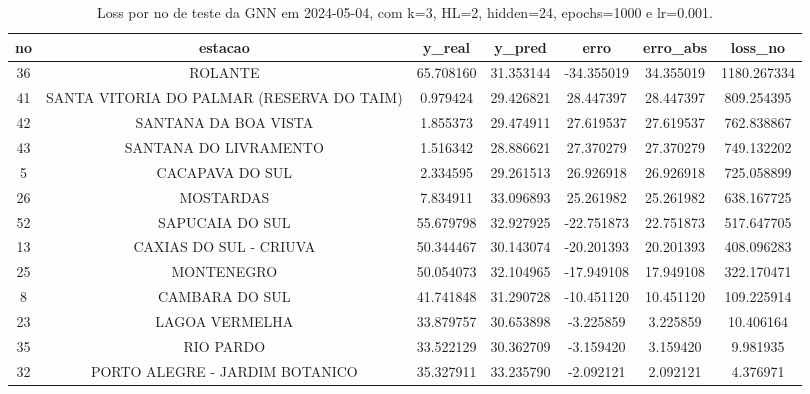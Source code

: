 \begin{table}[h]
\centering
\caption{Loss por no de teste da GNN em 2024-05-04, com k=3, HL=2, hidden=24, epochs=1000 e lr=0.001.}
\label{tab:gnn_loss_k3_hl2_h24_e1000_d20240504}
\begin{tabular}{ccccccc}
\toprule
no & estacao & y\_real & y\_pred & erro & erro\_abs & loss\_no \\
\midrule
36 & ROLANTE & 65.708160 & 31.353144 & -34.355019 & 34.355019 & 1180.267334 \\
41 & SANTA VITORIA DO PALMAR (RESERVA DO TAIM) & 0.979424 & 29.426821 & 28.447397 & 28.447397 & 809.254395 \\
42 & SANTANA DA BOA VISTA & 1.855373 & 29.474911 & 27.619537 & 27.619537 & 762.838867 \\
43 & SANTANA DO LIVRAMENTO & 1.516342 & 28.886621 & 27.370279 & 27.370279 & 749.132202 \\
5 & CACAPAVA DO SUL & 2.334595 & 29.261513 & 26.926918 & 26.926918 & 725.058899 \\
26 & MOSTARDAS & 7.834911 & 33.096893 & 25.261982 & 25.261982 & 638.167725 \\
52 & SAPUCAIA DO SUL & 55.679798 & 32.927925 & -22.751873 & 22.751873 & 517.647705 \\
13 & CAXIAS DO SUL - CRIUVA & 50.344467 & 30.143074 & -20.201393 & 20.201393 & 408.096283 \\
25 & MONTENEGRO & 50.054073 & 32.104965 & -17.949108 & 17.949108 & 322.170471 \\
8 & CAMBARA DO SUL & 41.741848 & 31.290728 & -10.451120 & 10.451120 & 109.225914 \\
23 & LAGOA VERMELHA & 33.879757 & 30.653898 & -3.225859 & 3.225859 & 10.406164 \\
35 & RIO PARDO & 33.522129 & 30.362709 & -3.159420 & 3.159420 & 9.981935 \\
32 & PORTO ALEGRE - JARDIM BOTANICO & 35.327911 & 33.235790 & -2.092121 & 2.092121 & 4.376971 \\
\bottomrule
\end{tabular}
\end{table}
